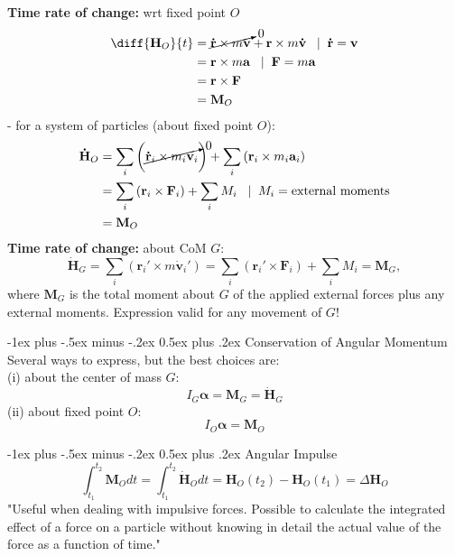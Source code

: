 \documentclass[10pt,landscape]{article}
\makeatletter
\renewcommand{\section}{\@startsection{section}{1}{0mm}%
                                {-1ex plus -.5ex minus -.2ex}%
                                {0.5ex plus .2ex}%
                                {\normalfont\large\bfseries}}
\makeatother
\begin{document}
\begin{multicols}{3}
    {\bf Time rate of change:} wrt fixed point $O$
    \begin{align*}
        \diff{\mathbf{H}_O}{t} &= \cancelto{0}{\mathbf{\dot{r}} \times m\mathbf{v}} + 
        \mathbf{r} \times m\mathbf{\dot{v}}\;\;\; | \;\; \mathbf{\dot{r}} = \mathbf{v}    \\
        &= \mathbf{r} \times m\mathbf{a}\;\;\; | \;\; \mathbf{F} = m\mathbf{a}    \\
        &= \mathbf{r} \times \mathbf{F} \\
        &= \mathbf{M}_O
    \end{align*}
    - for a system of particles (about fixed point $O$):
    \begin{align*}
        \mathbf{\dot{H}}_O &= \sum_i \left( \cancelto{0}{\mathbf{\dot{r}}_i \times m_i \mathbf{v}_i} \right) + 
            \sum_i \left( \mathbf{{r}}_i \times m_i \mathbf{a}_i \right) \\
        &= \sum_i \left( \mathbf{{r}}_i \times \mathbf{F}_i \right) + \sum_i M_i \;\;\; | \;\; M_i 
            = \text{external moments} \\
        &= \mathbf{M}_O
    \end{align*}
    {\bf Time rate of change:} about CoM $G$:
    \[\mathbf{\dot{H}}_G = \sum_i \left( \mathbf{r}_i' \times m \mathbf{\dot{v}}_i' \right) = 
        \sum_i \left( \mathbf{r}_i' \times \mathbf{F}_i \right) + \sum_i M_i = \mathbf{M}_G,\]
    where $\mathbf{M}_G$ is the total moment about $G$ of the applied external
    forces plus any external moments. Expression valid for any movement of $G$!


\section{Conservation of Angular Momentum}
    Several ways to express, but the best choices are:\\
    (i) about the center of mass $G$:
    \[ I_G \boldsymbol{\alpha} = \mathbf{M}_G = \mathbf{\dot{H}}_G \]
    (ii) about fixed point $O$:
    \[ I_O \boldsymbol{\alpha} = \mathbf{M}_O \]


\section{Angular Impulse}
    \[ \int_{t_1}^{t_2}{\mathbf{M}_O}dt = \int_{t_1}^{t_2}{\mathbf{\dot{H}}_O}dt 
        = \mathbf{H}_O(t_2) - \mathbf{H}_O(t_1) = \Delta \mathbf{H}_O \]
    "Useful when dealing with impulsive forces. Possible to calculate the 
    integrated effect of a force on a particle without knowing in detail the 
    actual value of the force as a function of time."\\



\end{multicols}
\end{document}
